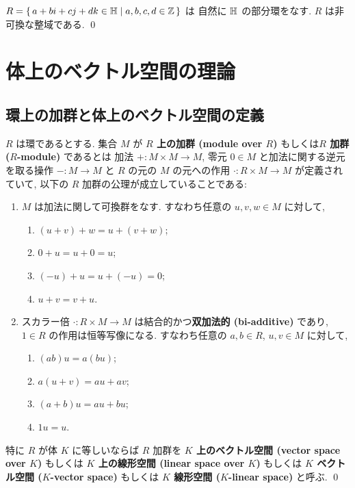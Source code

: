 \documentclass[12pt,twoside]{jarticle}
\begin{document}
\begin{example}
 $R=\{\,a+bi+cj+dk\in{\mathbb H}\mid a,b,c,d\in{\mathbb Z}\,\}$ は
 自然に ${\mathbb H}$ の部分環をなす.
 $R$ は非可換な整域である.
 \qed
\end{example}


\section{体上のベクトル空間の理論}


\subsection{環上の加群と体上のベクトル空間の定義}


\begin{definition}[環上の加群と体上のベクトル空間]
  $R$ は環であるとする.
  集合 $M$ が {\bf $R$ 上の加群 (module over $R$)} 
  もしくは{\bf $R$ 加群 ($R$-module)} であるとは
  加法 $+:M\times M\to M$, 零元 $0\in M$ 
  と加法に関する逆元を取る操作 $-:M\to M$ 
  と $R$ の元の $M$ の元への作用 $\cdot:R\times M\to M$ が定義されていて, 
  以下の $R$ 加群の公理が成立していることである:
  \begin{enumerate}
  \item $M$ は加法に関して可換群をなす. 
    すなわち任意の $u,v,w\in M$ に対して,
    \begin{enumerate}
    \item $(u + v) + w = u + (v + w)$;
    \item $0 + u = u + 0 = u$;
    \item $(-u) + u = u + (-u) = 0$;
    \item $u + v = v + u$.
    \end{enumerate}
  \item スカラー倍 $\cdot:R\times M\to M$ は結合的かつ{\bf 双加法的 
      (bi-additive)} であり, $1\in R$ の作用は恒等写像になる.
    すなわち任意の $a,b\in R$, $u,v\in M$ に対して,
    \begin{enumerate}
    \item $(ab)u = a(bu)$;
    \item $a(u + v) = au + av$;
    \item $(a + b)u = au + bu$;
    \item $1u = u$.
    \end{enumerate}
  \end{enumerate}
  特に $R$ が体 $K$ に等しいならば $R$ 加群を
  {\bf $K$ 上のベクトル空間 (vector space over $K$)} もしくは
  {\bf $K$ 上の線形空間 (linear space over $K$)} もしくは
  {\bf $K$ ベクトル空間 ($K$-vector space)} もしくは
  {\bf $K$ 線形空間 ($K$-linear space)} と呼ぶ.
  \qed
\end{definition}
\end{document}
